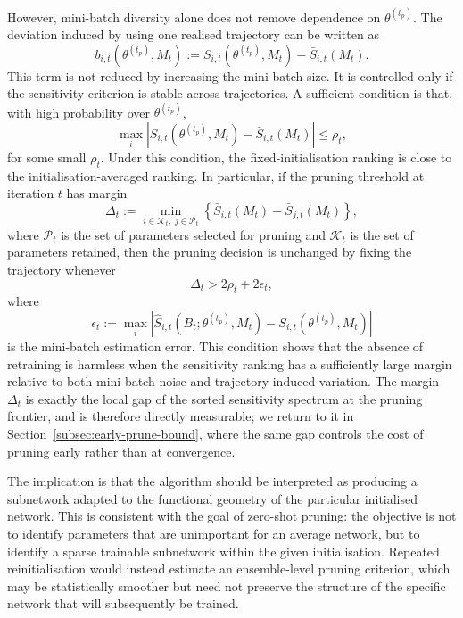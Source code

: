 \documentclass{article}
\theoremstyle{definition}
\theoremstyle{remark}
\begin{document}
However, mini-batch diversity alone does not remove dependence on
$\theta^{(t_p)}$. The deviation induced by using one realised trajectory can be
written as
\begin{equation}
    b_{i,t}(\theta^{(t_p)},M_t)
    :=
    S_{i,t}(\theta^{(t_p)},M_t)
    -
    \bar S_{i,t}(M_t).
\end{equation}
This term is not reduced by increasing the mini-batch size. It is controlled
only if the sensitivity criterion is stable across trajectories. A sufficient
condition is that, with high probability over $\theta^{(t_p)}$,
\begin{equation}
    \max_i
    \left|
        S_{i,t}(\theta^{(t_p)},M_t)
        -
        \bar S_{i,t}(M_t)
    \right|
    \leq
    \rho_t,
\end{equation}
for some small $\rho_t$. Under this condition, the fixed-initialisation ranking
is close to the initialisation-averaged ranking. In particular, if the pruning
threshold at iteration $t$ has margin
\begin{equation}
    \Delta_t
    :=
    \min_{i \in \mathcal K_t,\; j \in \mathcal P_t}
    \left\{
        \bar S_{i,t}(M_t) - \bar S_{j,t}(M_t)
    \right\},
\end{equation}
where $\mathcal P_t$ is the set of parameters selected for pruning and
$\mathcal K_t$ is the set of parameters retained, then the pruning decision is
unchanged by fixing the trajectory whenever
\begin{equation}
    \Delta_t
    >
    2\rho_t + 2\epsilon_t,
\end{equation}
where
\begin{equation}
    \epsilon_t
    :=
    \max_i
    \left|
        \widehat S_{i,t}(B_t;\theta^{(t_p)},M_t)
        -
        S_{i,t}(\theta^{(t_p)},M_t)
    \right|
\end{equation}
is the mini-batch estimation error. This condition shows that the absence of retraining is harmless when the
sensitivity ranking has a sufficiently large margin relative to both mini-batch
noise and trajectory-induced variation. The margin $\Delta_t$ is exactly the
local gap of the sorted sensitivity spectrum at the pruning frontier, and is
therefore directly measurable; we return to it in
Section~\ref{subsec:early-prune-bound}, where the same gap controls the cost of
pruning early rather than at convergence.

The implication is that the algorithm should be interpreted as producing a
subnetwork adapted to the functional geometry of the particular initialised
network. This is consistent with the goal of zero-shot pruning: the objective is
not to identify parameters that are unimportant for an average network, but to
identify a sparse trainable subnetwork within the given initialisation. Repeated
reinitialisation would instead estimate an ensemble-level pruning criterion,
which may be statistically smoother but need not preserve the structure of the
specific network that will subsequently be trained.
\end{document}
